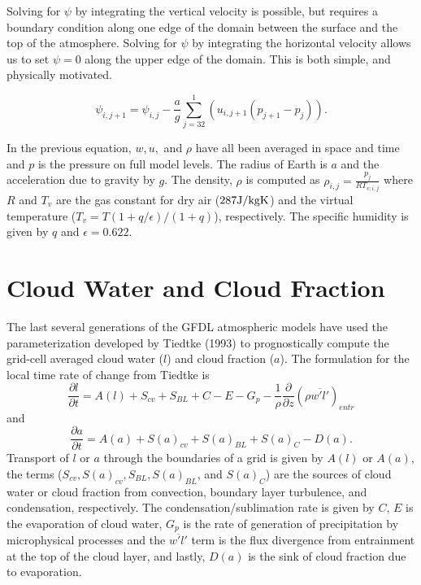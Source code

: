 \documentclass[11pt]{article}   	%
\begin{document}
Solving for $\psi$ by integrating the vertical velocity is possible, but requires a boundary condition along one edge of the domain between the surface and the 
top of the atmosphere.  Solving for $\psi$ by integrating the horizontal velocity allows us to set $\psi=0$ along the upper edge of the domain.  
This is both simple, and physically motivated.  

\begin{equation}
\psi_{i,j+1}= \psi_{i,j}-\frac{a}{g}\sum_{j=32}^1 \left(u_{i,j+1}(p_{j+1}-p_{j})\right).
\end{equation}

In the previous equation, $w, u,$ and $\rho$ have all been averaged in space and time and $p$ is the pressure on full model levels.  The 
radius of Earth is $a$ and the acceleration due to gravity by $g$.  The density, $\rho$ is computed as $ \rho_{i,j}=\frac{p_j}{R T_{v;i,j}}  $  where $R$ and $T_v$ are the gas constant for dry air ($287 \rm{J/kg K}$) and the virtual temperature ($T_v=T(1+q/\epsilon)/(1+q)$), respectively.  The specific humidity is given by $q$ and $\epsilon = 0.622$.


\section{Cloud Water and Cloud Fraction}

The last several generations of the GFDL atmospheric models have used the parameterization developed by Tiedtke (1993) to prognostically compute the grid-cell averaged cloud water ($l$) and cloud fraction ($a$).  The formulation for the local time rate of change from Tiedtke is 
\begin{equation}
  \frac{\partial l}{\partial t} = A(l)+S_{cv}+S_{BL}+C-E-G_{p}-\frac{1}{\rho}\frac{\partial}{\partial z}(\rho\overline{w'l'})_{entr}
\end{equation}
and 
\begin{equation}
  \frac{\partial a}{\partial t} = A(a)+S(a)_{cv}+S(a)_{BL}+S(a)_C-D(a).
\end{equation}
Transport of $l$ or $a$ through the boundaries of a grid is given by $A(l)$ or $A(a)$, the terms ($S_{cv}, S(a)_{cv}, S_{BL}, S(a)_{BL}$, and $S(a)_C$) are the sources of cloud water or cloud fraction from convection, boundary layer turbulence, and condensation, respectively.  The condensation/sublimation rate is given by $C$, $E$ is the evaporation of cloud water, $G_{p}$ is the rate of generation of precipitation by microphysical processes and the $\overline{w'l'}$ term is the flux divergence from entrainment at the top of the cloud layer, and lastly, $D(a)$ is the sink of cloud fraction due to evaporation.
\end{document}
